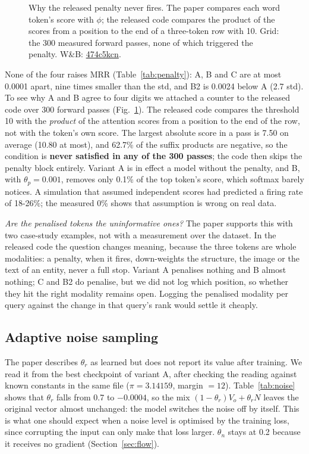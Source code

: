 \documentclass[conference,a4paper]{IEEEtran}
\newcommand{\wb}[2]{\href{https://wandb.ai/nhantrnh-graphml/#1}{{\normalfont\ttfamily #2}}}
\begin{document}
\begin{figure}[!t]
\centering
\resizebox{\columnwidth}{!}{}
\caption{Why the released penalty never fires. The paper compares each word token's score with $\phi$; the released code compares the product of the scores from a position to the end of a three-token row with 10. Grid: the 300 measured forward passes, none of which triggered the penalty. W\&B: \wb{apkgc-repro/runs/474c5kcn}{474c5kcn}.}
\label{fig:penalty}
\end{figure}

None of the four raises MRR (Table~\ref{tab:penalty}): A, B and C are at most 0.0001 apart,
nine times smaller than the std, and B2 is 0.0024 below A (2.7 std). To see why A and B
agree to four digits we attached a counter to the released code over 300 forward passes
(Fig.~\ref{fig:penalty}).
The released code compares the threshold 10 with the \emph{product} of the attention
scores from a position to the end of the row, not with the token's own score. The largest
absolute score in a pass is 7.50 on average (10.80 at most), and 62.7\% of the suffix
products are negative, so the condition is \textbf{never satisfied in any of the 300
passes}; the code then skips
the penalty block entirely. Variant A is in effect a model without the penalty, and B, with
$\theta_p=0.001$, removes only 0.1\% of the top token's score, which softmax barely
notices. A simulation that assumed independent scores had predicted a firing rate of
18-26\%; the measured 0\% shows that assumption is wrong on real data.

\emph{Are the penalised tokens the uninformative ones?} The paper supports this with two
case-study examples, not with a measurement over the dataset. In the released code the
question changes meaning, because the three tokens are whole modalities: a penalty, when it
fires, down-weights the structure, the image or the text of an entity, never a full stop.
Variant A penalises nothing and B almost nothing; C and B2 do penalise, but we did not log
which position, so whether they hit the right modality remains open. Logging the penalised
modality per query against the change in that query's rank would settle it cheaply.

\subsection{Adaptive noise sampling}
\label{sec:c3}
The paper describes $\theta_r$ as learned but does not report its value after training. We
read it from the best checkpoint of variant A, after checking the reading against known
constants in the same file ($\pi=3.14159$, margin $=12$). Table~\ref{tab:noise} shows that
$\theta_r$ falls from 0.7 to $-0.0004$, so the mix $(1-\theta_r)V_o+\theta_r N$ leaves the
original vector almost unchanged: the model switches the noise off by itself. This is what
one should expect when a noise level is optimised by the training loss, since corrupting
the input can only make that loss larger. $\theta_n$ stays at 0.2 because it receives no
gradient (Section~\ref{sec:flow}).
\end{document}
